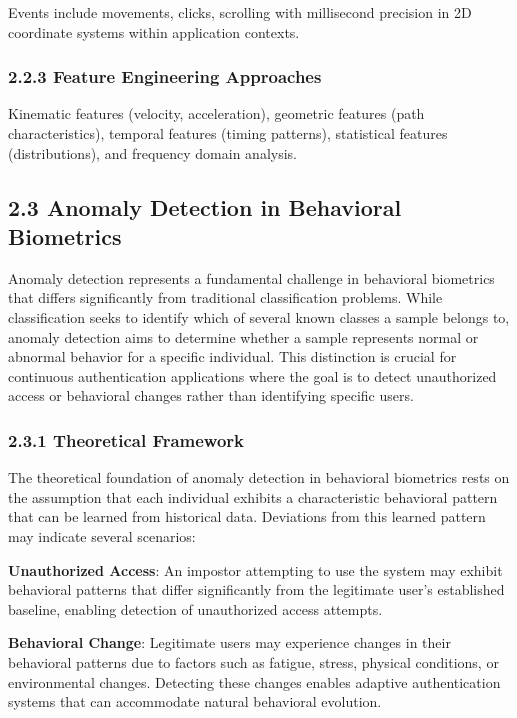 \documentclass[
  11pt,
  a4paper,
]{article}
\begin{document}
Events include movements, clicks, scrolling with millisecond precision
in 2D coordinate systems within application contexts.

\subsubsection{2.2.3 Feature Engineering
Approaches}\label{feature-engineering-approaches}

Kinematic features (velocity, acceleration), geometric features (path
characteristics), temporal features (timing patterns), statistical
features (distributions), and frequency domain analysis.

\subsection{2.3 Anomaly Detection in Behavioral
Biometrics}\label{anomaly-detection-in-behavioral-biometrics}

Anomaly detection represents a fundamental challenge in behavioral
biometrics that differs significantly from traditional classification
problems. While classification seeks to identify which of several known
classes a sample belongs to, anomaly detection aims to determine whether
a sample represents normal or abnormal behavior for a specific
individual. This distinction is crucial for continuous authentication
applications where the goal is to detect unauthorized access or
behavioral changes rather than identifying specific users.

\subsubsection{2.3.1 Theoretical Framework}\label{theoretical-framework}

The theoretical foundation of anomaly detection in behavioral biometrics
rests on the assumption that each individual exhibits a characteristic
behavioral pattern that can be learned from historical data. Deviations
from this learned pattern may indicate several scenarios:

\textbf{Unauthorized Access}: An impostor attempting to use the system
may exhibit behavioral patterns that differ significantly from the
legitimate user's established baseline, enabling detection of
unauthorized access attempts.

\textbf{Behavioral Change}: Legitimate users may experience changes in
their behavioral patterns due to factors such as fatigue, stress,
physical conditions, or environmental changes. Detecting these changes
enables adaptive authentication systems that can accommodate natural
behavioral evolution.
\end{document}
